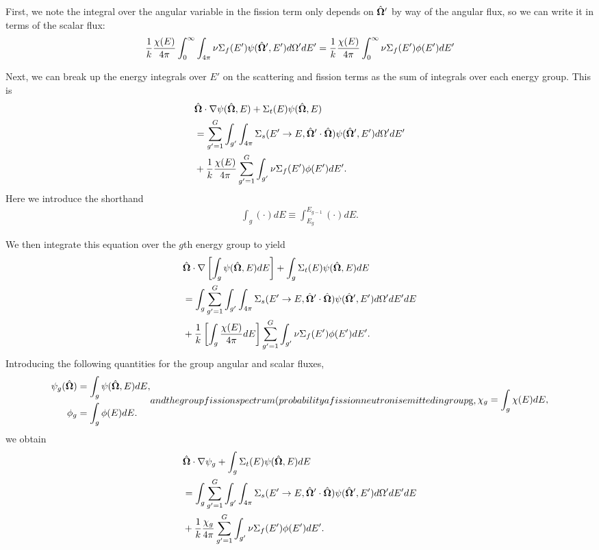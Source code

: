 First, we note the integral over the angular variable in the fission term only depends on $\hat{\mathbf{\Omega}}'$ by way of the angular flux, so we can write it in terms of the scalar flux:
\begin{align}
  \frac{1}{k} \frac{\chi(E)}{4\pi}  \int_0^\infty \int_{4\pi} \nu\Sigma_f(E') \psi(\hat{\mathbf{\Omega}}',E') d\Omega' dE' = 
   \frac{1}{k} \frac{\chi(E)}{4\pi}  \int_0^\infty \nu\Sigma_f(E') \phi(E') dE'
\end{align}

Next, we can break up the energy integrals over $E'$ on the scattering and fission terms as the sum of integrals over each energy group. This is
\begin{align}
  &\hat{\mathbf{\Omega}} \cdot \nabla \psi(\hat{\mathbf{\Omega}},E) + \Sigma_t(E) \psi(\hat{\mathbf{\Omega}},E) \nonumber \\
  &= \sum_{g'=1}^G \int_{g'} \int_{4\pi} \Sigma_s(E' \rightarrow E, \hat{\mathbf{\Omega}}' \cdot \hat{\mathbf{\Omega}}) \psi(\hat{\mathbf{\Omega}}',E') d\Omega' dE' \nonumber \\
  &+ \frac{1}{k} \frac{\chi(E)}{4\pi} \sum_{g'=1}^G \int_{g'}  \nu\Sigma_f(E') \phi(E') dE'.
\end{align}
Here we introduce the shorthand
\begin{align}
  \int_g (\cdot) dE \equiv \int_{E_g}^{E_{g-1}} (\cdot) dE .
\end{align}

We then integrate this equation over the $g$th energy group to yield
\begin{align}
  &\hat{\mathbf{\Omega}} \cdot \nabla \left[ \int_g \psi(\hat{\mathbf{\Omega}},E) dE \right] + \int_g \Sigma_t(E) \psi(\hat{\mathbf{\Omega}},E) dE \nonumber \\
  &= \int_g \sum_{g'=1}^G \int_{g'} \int_{4\pi} \Sigma_s(E' \rightarrow E, \hat{\mathbf{\Omega}}' \cdot \hat{\mathbf{\Omega}}) \psi(\hat{\mathbf{\Omega}}',E') d\Omega' dE' dE \nonumber \\
  &+ \frac{1}{k} \left[ \int_g \frac{\chi(E)}{4\pi} dE \right] \sum_{g'=1}^G \int_{g'}  \nu\Sigma_f(E') \phi(E') dE'.
\end{align}
Introducing the following quantities for the group angular and scalar fluxes,
\begin{subequations}
\begin{align}
  \psi_g(\dir) &= \int_g \psi(\dir,E) dE, \\
  \phi_g &= \int_g \phi(E) dE.
\end{align}
and the group fission spectrum (probability a fission neutron is emitted in group $g$,
\begin{align}
  \chi_g = \int_g \chi(E) dE ,
\end{align}
\end{subequations}
we obtain
\begin{align}
  &\hat{\mathbf{\Omega}} \cdot \nabla \psi_g + \int_g \Sigma_t(E) \psi(\hat{\mathbf{\Omega}},E) dE \nonumber \\
  &= \int_g \sum_{g'=1}^G \int_{g'} \int_{4\pi} \Sigma_s(E' \rightarrow E, \hat{\mathbf{\Omega}}' \cdot \hat{\mathbf{\Omega}}) \psi(\hat{\mathbf{\Omega}}',E') d\Omega' dE' dE \nonumber \\
  &+ \frac{1}{k} \frac{\chi_g}{4\pi} \sum_{g'=1}^G \int_{g'}  \nu\Sigma_f(E') \phi(E') dE'.
\end{align}

